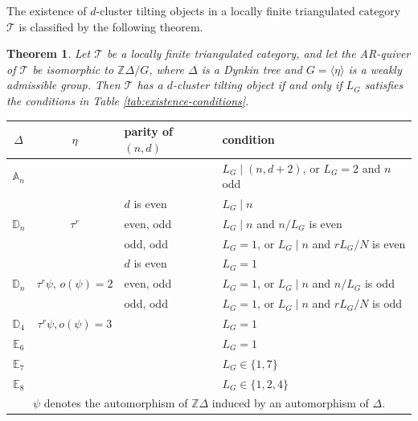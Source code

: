 \documentclass[12pt]{article}
\theoremstyle{plain}
\newtheorem{Theo}[Def]{Theorem}
\theoremstyle{definition}
\newcommand{\T}{\mathcal{T}}
\begin{document}
\medskip 
The   existence  of $d$-cluster tilting objects in a locally finite triangulated category $\T$ is classified by the following theorem. 
\begin{Theo}\label{theo-existence-dct}
Let $\T$ be a locally finite triangulated category, and let the AR-quiver of $\T$ be isomorphic to $\mathbb{Z}\Delta/G$, where $\Delta$ is a Dynkin tree and $G=\langle\eta\rangle$ is a weakly admissible group. Then $\T$ has a $d$-cluster tilting object if and only if $L_G$ satisfies the conditions in Table \ref{tab:existence-conditions}.
\end{Theo}

\begin{center}
\centering
\renewcommand{\arraystretch}{1.25}
\begin{tabular}{c|c|l||p{}}
\toprule
$\Delta$ & $\eta$ & parity of $(n,d)$ &condition\\
\hline
$\mathbb{A}_n$ & & & $L_G \mid (n,d+2)$, or $L_G=2$ and $n$ odd\\
\hline 
	\multirow{3}{*}{$\mathbb{D}_n$} & \multirow{3}{*}{$\tau^r$} & $d$ is even & $L_G\mid n$\\
	&& even, odd & $L_G\mid n$ and $n/L_G$ is even\\
	&& odd, odd & $L_G=1$, or $L_G\mid n$ and $rL_G/N$ is even\\
\hline
\multirow{3}{*}{$\mathbb{D}_n$} & \multirow{3}{*}{$\tau^r\psi,\, o(\psi)=2$} & $d$ is even & $L_G=1$\\
&& even, odd &  $L_G=1$, or $L_G\mid n$ and $n/L_G$ is odd\\
&& odd, odd & $L_G=1$, or $L_G\mid n$ and $rL_G/N$ is odd\\
\hline
$\mathbb{D}_4$ & $\tau^r\psi,o(\psi)=3$ & & $L_G=1$\\
\hline
\(\mathbb{E}_6\) & & & \(L_G=1\)\\
\hline
\(\mathbb{E}_7\) & & & \(L_G\in\{1,7\}\)\\
\hline
$\mathbb{E}_8$ & & & $L_G\in\{1,2,4\}$\\
\hline 
\multicolumn{4}{c}{\parbox{0.86\textwidth}{\centering
\(\psi\) denotes the automorphism of \(\mathbb Z\Delta\) induced by an
automorphism of \(\Delta\).}}\\
\bottomrule
\end{tabular}
\vspace{0.5em}
\label{tab:existence-conditions}
\end{center}
\end{document}
